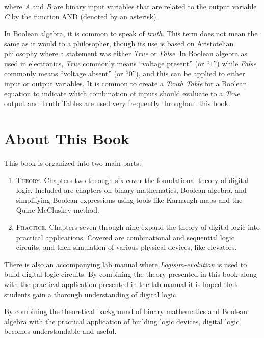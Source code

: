 where \emph{A} and \emph{B} are binary input variables that are related to the output variable \emph{C} by the function \textsf{AND} (denoted by an asterisk).

In Boolean algebra, it is common to speak of \emph{truth}. This term does not mean the same as it would to a philosopher, though its use is based on Aristotelian philosophy where a statement was either \emph{True} or \emph{False}. In Boolean algebra as used in electronics, \emph{True} commonly means ``voltage present'' (or ``$ 1 $'') while \emph{False} commonly means ``voltage absent'' (or ``$ 0 $''), and this can be applied to either input or output variables. It is common to create a \emph{Truth Table} for a Boolean equation to indicate which combination of inputs should evaluate to a \emph{True} output and Truth Tables are used very frequently throughout this book.

\section{About This Book}

This book is organized into two main parts:

\begin{enumerate}
  \item \textsc{Theory}. Chapters two through six cover the foundational theory of digital logic. Included are chapters on binary mathematics, Boolean algebra, and simplifying Boolean expressions using tools like Karnaugh maps and the Quine-McCluskey method.
  
  \item \textsc{Practice}. Chapters seven through nine expand the theory of digital logic into practical applications. Covered are combinational and sequential logic circuits, and then simulation of various physical devices, like elevators.
\end{enumerate}

There is also an accompanying lab manual where \textit{Logisim-evolution} is used to build digital logic circuits. By combining the theory presented in this book along with the practical application presented in the lab manual it is hoped that students gain a thorough understanding of digital logic.

By combining the theoretical background of binary mathematics and Boolean algebra with the practical application of building logic devices, digital logic becomes understandable and useful.

